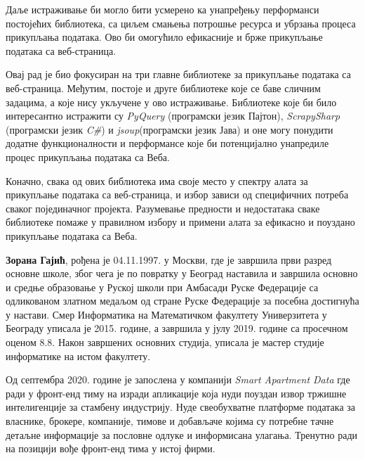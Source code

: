 \documentclass[12pt,oneside]{memoir}
\begin{document}
Даље истраживање би могло бити усмерено ка унапређењу перформанси постојећих библиотека, са циљем смањења потрошње ресурса и убрзања процеса прикупљања података. Ово би омогућило ефикасније и брже прикупљање података са веб-страница.

Овај рад је био фокусиран на три главне библиотеке за прикупљање података са веб-страница. Међутим, постоје и друге библиотеке које се баве сличним задацима, а које нису укључене у ово истраживање. Библиотеке које би било интересантно истражити су \textit{PyQuery}\cite{pyquery} (програмски језик Пајтон), \textit{ScrapySharp}\cite{scrapySharp} (програмски језик \textit{C\#}) и \textit{jsoup}\cite{jsoup}(програмски језик Јава) и оне могу понудити додатне функционалности и перформансе које би потенцијално унапредиле процес прикупљања података са Веба.

Коначно, свака од ових библиотека има своје место у спектру алата за прикупљање података са веб-страница, и избор зависи од специфичних потреба сваког појединачног пројекта. Разумевање предности и недостатака сваке библиотеке помаже у правилном избору и примени алата за ефикасно и поуздано прикупљање података са Веба.


\literatura

\backmatter

\begin{biografija}
\textbf{Зорана Гајић}, рођена је 04.11.1997. у Москви, где је завршила први разред основне школе, због чега је по повратку у Београд наставила и завршила основно и средње образовање у Руској школи при Амбасади Руске Федерације са одликованом златном медаљом од стране Руске Федерације за посебна достигнућа у настави. Смер Информатика на Математичком факултету Универзитета у Београду уписала је 2015. године, а завршила у јулу 2019. године са просечном оценом 8.8. Након завршених основних студија, уписала је мастер студије информатике на истом факултету.

Од септембра 2020. године је запослена у компанији \textit{Smart Apartment Data} где ради у фронт-енд тиму на изради апликације која нуди поуздан извор тржишне интелигенције за стамбену индустрију. Нуде свеобухватне платформе података за власнике, брокере, компаније, тимове и добављаче којима су потребне тачне детаљне информације за пословне одлуке и информисана улагања. Тренутно ради на позицији вође фронт-енд тима у истој фирми.
\end{biografija}
\end{document}
